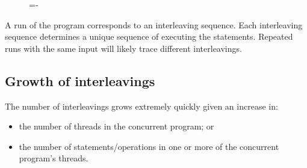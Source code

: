 \documentclass[a4paper]{systems-software}
\begin{document}
\begin{figure}[H]
  \lineskip=-\fboxrule
\end{figure}

A run of the program corresponds to an interleaving sequence. Each interleaving sequence determines a unique sequence of executing the statements. Repeated runs with the same input will likely trace different interleavings.


\subsection*{Growth of interleavings}

The number of interleavings grows extremely quickly given an increase in:
\begin{itemize}
	\item the number of threads in the concurrent program; or
	\item the number of statements/operations in one or more of the concurrent program’s threads.
\end{itemize}
\end{document}
